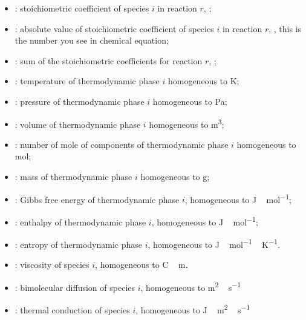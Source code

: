 \begin{itemize}
\item \scoef[i,r]:        stoichiometric coefficient of species $i$ in reaction $r$, \nounit;
\item \scoefabs[i,r]:     absolute value of stoichiometric coefficient of species $i$ in reaction $r$, \nounit, this is the number
                            you see in chemical equation;
\item \sumscoef[r]:       sum of the stoichiometric coefficients for reaction $r$, \nounit;
\item \Temp[i]:           temperature of thermodynamic  phase $i$ homogeneous to \unit{K}; 
\item \Press[i]:          pressure of thermodynamic  phase $i$ homogeneous to \unit{Pa}; 
\item \Vol[i]:            volume of thermodynamic  phase $i$ homogeneous to \unit{m^3}; 
\item \Mol[i]:            number of mole of components of thermodynamic  phase $i$ homogeneous to \unit{mol}; 
\item \Mass[i]:           mass of thermodynamic  phase $i$ homogeneous to \unit{g}; 
\item \Gibbs[i]:          Gibbs free energy of thermodynamic phase $i$, homogeneous to \unit{J\,mol^{-1}};
\item \Enth[i]:           enthalpy of thermodynamic phase $i$, homogeneous to \unit{J\,mol^{-1}};
\item \Entr[i]:           entropy of thermodynamic phase $i$, homogeneous to \unit{J\,mol^{-1}\,K^{-1}}.
\item \vis[i]:            viscosity of species $i$, homogeneous to \unit{C\,m}.
\item \diff[i]:           bimolecular diffusion of species $i$, homogeneous to \unit{m^2\,s^{-1}}
\item \thermcond[i]:      thermal conduction of species $i$, homogeneous to \unit{J\,m^2\,s^{-1}}
\end{itemize}
%
